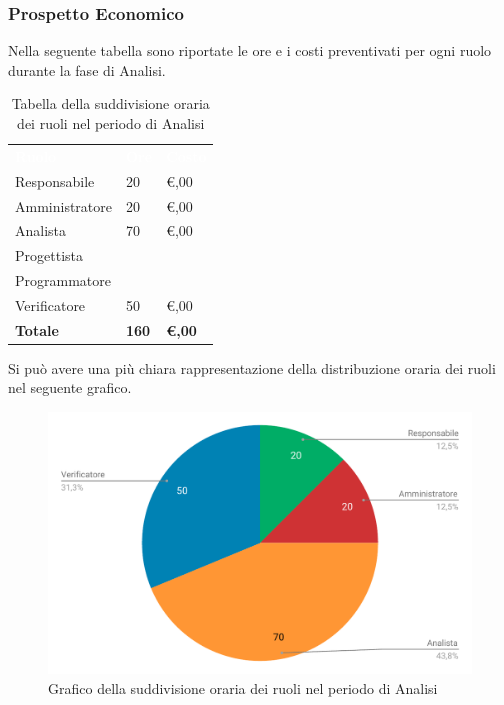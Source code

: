 \subsubsection{Prospetto Economico}
Nella seguente tabella sono riportate le ore e i costi preventivati per ogni ruolo durante la fase di Analisi.


\begin{table}[H]	
	\begin{center}
	    \begin{tabular}{C{4cm}C{1cm}C{3,5cm}}
			\textcolor{white}{\textbf{Ruolo}} & \textcolor{white}{\textbf{Ore}} & \textcolor{white}{\textbf{Costo}}
			\\
			Responsabile & 20 & \euro {},00 \\
			Amministratore & 20 & \euro {},00 \\
			Analista & 70 & \euro {},00 \\
			Progettista &  & \\
			Programmatore &  & \\
			Verificatore & 50 & \euro {},00 \\
			\textbf{Totale} & \textbf{160} & \textbf{\euro {},00} \\
		\end{tabular}
	    \caption{Tabella della suddivisione oraria dei ruoli nel periodo di Analisi} \label{tab:tabellaRuoliAnalisi} 
	\end{center}
\end{table}


Si può avere una più chiara rappresentazione della distribuzione oraria dei ruoli nel seguente grafico.

\begin{figure}[H]
	\includegraphics[width=1\linewidth]{Preventivo/grafici/AN2.pdf}
	\caption{Grafico della suddivisione oraria dei ruoli nel periodo di Analisi}
\end{figure}

